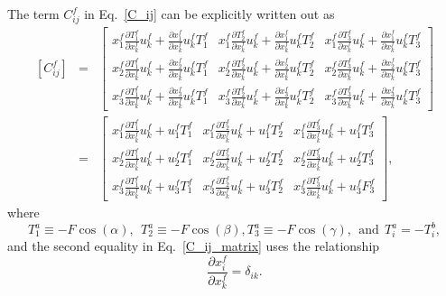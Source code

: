 \documentclass[12pt,aps,pre]{revtex4}
\begin{document}
The term $C_{ij}^f$ in Eq.\ \eqref{C_ij} can be explicitly written out as
%
\begin{eqnarray}
\left[ C_{ij}^f \right] &=& 
\begin{bmatrix}
x_1^f \frac{\partial T_1^f}{\partial x_k^f} u_k^f + \frac{\partial x_1^f}{\partial x_k^f}u_k^f T_1^f  & x_1^f \frac{\partial T_2^f}{\partial x_k^f} u_k^f + \frac{\partial x_1^f}{\partial x_k^f}u_k^f T_2^f & x_1^f \frac{\partial T_3^f}{\partial x_k^f} u_k^f + \frac{\partial x_1^f}{\partial x_k^f}u_k^f T_3^f\\
%
x_2^f \frac{\partial T_1^f}{\partial x_k^f} u_k^f  + \frac{\partial x_2^f}{\partial x_k^f} u_k^fT_1^f & x_2^f \frac{\partial T_2^f}{\partial x_k^f} u_k^f  + \frac{\partial x_2^f}{\partial x_k^f} u_k^fT_2^f & x_2^f \frac{\partial T_3^f}{\partial x_k^f} u_k^f  + \frac{\partial x_2^f}{\partial x_k^f} u_k^fT_3^f \\
%
x_3^f \frac{\partial T_1^f}{\partial x_k^f} u_k^f  + \frac{\partial x_3^f}{\partial x_k^f}u_k^f T_1^f & x_3^f \frac{\partial T_2^f}{\partial x_k^f} u_k^f + \frac{\partial x_3^f}{\partial x_k^f} u_k^f T_2^f & x_3^f \frac{\partial T_3^f}{\partial x_k^f} u_k^f + \frac{\partial x_3^f}{\partial x_k^f}u_k^f T_3^f
\end{bmatrix} \nonumber\\
%
&=&
%
\begin{bmatrix}
x_1^f \frac{\partial T_1^f}{\partial x_k^f} u_k^f +  u_1^f T_1^f  & x_1^f \frac{\partial T_2^f}{\partial x_k^f} u_k^f + u_1^f T_2^f & x_1^f \frac{\partial T_3^f}{\partial x_k^f} u_k^f + u_1^f T_3^f\\
%
x_2^f \frac{\partial T_1^f}{\partial x_k^f} u_k^f  +  u_2^f T_1^f & x_2^f \frac{\partial T_2^f}{\partial x_k^f} u_k^f  + u_2^f T_2^f & x_2^f \frac{\partial T_3^f}{\partial x_k^f} u_k^f  + u_2^f T_3^f \\
%
x_3^f \frac{\partial T_1^f}{\partial x_k^f} u_k^f  + u_3^f T_1^f & x_3^f \frac{\partial T_2^f}{\partial x_k^f} u_k^f + u_3^f T_2^f & x_3^f \frac{\partial T_3^f}{\partial x_k^f} u_k^f + u_3^f F_3^f
\label{C_ij_matrix}
\end{bmatrix} ,
%
\end{eqnarray}
%
where 
%
\begin{equation}
T_1^a \equiv -F \cos(\alpha), \ \ T_2^a \equiv -F \cos(\beta), T_3^a \equiv -F \cos(\gamma), \ \ \text{and} \ \ T_i^a = -T_i^b,
\end{equation}
%
and the second equality in Eq.\ \eqref{C_ij_matrix} uses the relationship
%
\begin{equation}
\frac{\partial x_i^f}{\partial x_k^f} = \delta_{ik} .
\end{equation}
%
\end{document}
